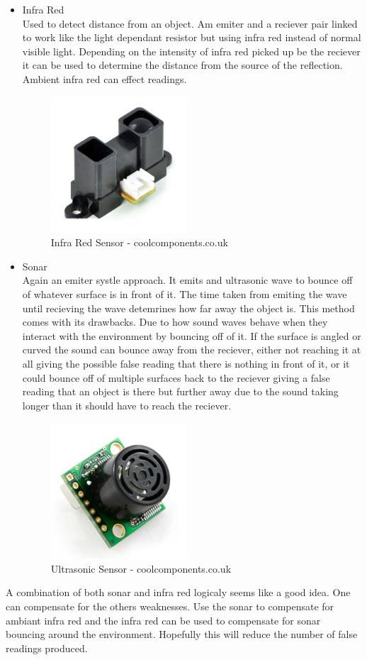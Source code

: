 \begin{itemize}
\item Infra Red
\\Used to detect distance from an object.  Am emiter and a reciever pair linked to work like the light dependant resistor but using infra red instead of normal visible light.  Depending on the intensity of infra red picked up be the reciever it can be used to determine the distance from the source of the reflection.  Ambient infra red can effect readings.
\begin{figure}[h]
\centering
        \includegraphics[width=2.0in] {Images/ir.jpg}
        \caption{Infra Red Sensor - coolcomponents.co.uk}
        \label{Infra Red Sensor}
\end{figure}

\item Sonar
\\Again an emiter systle approach.  It emits and ultrasonic wave to bounce off of whatever surface is in front of it.  The time taken from emiting the wave until recieving the wave detemrines how far away the object is.  This method comes with its drawbacks.  Due to how sound waves behave when they interact with the environment by bouncing off of it.  If the surface is angled or curved the sound can bounce away from the reciever, either not reaching it at all giving the possible false reading that there is nothing in front of it, or it could bounce off of multiple surfaces back to the reciever giving a false reading that an object is there but further away due to the sound taking longer than it should have to reach the reciever.
\begin{figure}[h]
\centering
        \includegraphics[width=2.0in] {Images/sonar.jpg}
        \caption{Ultrasonic Sensor - coolcomponents.co.uk}
        \label{Ultrasonic Sensor}
\end{figure}

\end{itemize}
A combination of both sonar and infra red logicaly seems like a good idea.  One can compensate for the others weaknesses.  Use the sonar to compensate for ambiant infra red and the infra red can be used to compensate for sonar bouncing around the environment.  Hopefully this will reduce the number of false readings produced.
